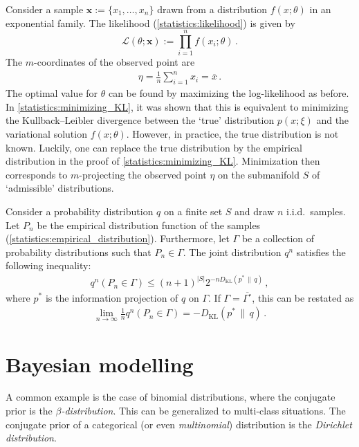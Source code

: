     Consider a sample $\mathbf{x}:=\{x_1,\ldots,x_n\}$ drawn from a distribution $f(x;\theta)$ in an exponential family. The likelihood (\cref{statistics:likelihood}) is given by \[\mathcal{L}(\theta;\mathbf{x}) := \prod_{i=1}^nf(x_i;\theta)\,.\] The $m$-coordinates of the observed point are
    \begin{gather}
        \eta = \frac{1}{n}\sum_{i=1}^nx_i = \overline{x}\,.
    \end{gather}
    The optimal value for $\theta$ can be found by maximizing the log-likelihood as before. In \cref{statistics:minimizing_KL}, it was shown that this is equivalent to minimizing the Kullback--Leibler divergence between the `true' distribution $p(x;\xi)$ and the variational solution $f(x;\theta)$. However, in practice, the true distribution is not known. Luckily, one can replace the true distribution by the empirical distribution in the proof of \cref{statistics:minimizing_KL}. Minimization then corresponds to $m$-projecting the observed point $\eta$ on the submanifold $S$ of `admissible' distributions.

    \begin{theorem}[Sanov]
        Consider a probability distribution $q$ on a finite set $S$ and draw $n$ i.i.d.~samples. Let $P_n$ be the empirical distribution function of the samples (\cref{statistics:empirical_distribution}). Furthermore, let $\Gamma$ be a collection of probability distributions such that $P_n\in\Gamma$. The joint distribution $q^n$ satisfies the following inequality:
        \begin{gather}
            q^n(P_n\in\Gamma) \leq (n+1)^{|S|}2^{-n D_{\text{KL}}(p^*\,\|\,q)}\,,
        \end{gather}
        where $p^*$ is the information projection of $q$ on $\Gamma$. If $\Gamma=\overline{\Gamma^\circ}$, this can be restated as
        \begin{gather}
            \lim_{n\rightarrow\infty}\frac{1}{n}q^n(P_n\in\Gamma) = - D_{\text{KL}}(p^*\,\|\,q)\,.
        \end{gather}
    \end{theorem}

\section{Bayesian modelling}

    \begin{example}
        A common example is the case of binomial distributions, where the conjugate prior is the \textit{$\beta$-distribution}. This can be generalized to multi-class situations. The conjugate prior of a categorical (or even \textit{multinomial}) distribution is the \textit{Dirichlet distribution}.
    \end{example}

